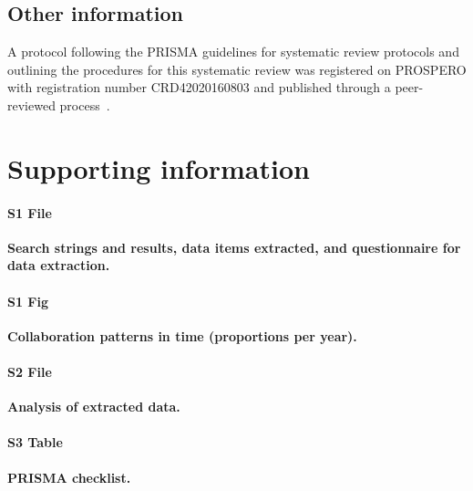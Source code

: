 \documentclass[10pt,letterpaper]{article}
\begin{document}
\subsection*{Other information}
A protocol following the PRISMA guidelines for systematic review protocols and outlining the procedures for this systematic review was registered on PROSPERO with registration number CRD42020160803 and published through a peer-reviewed process~\cite{Azam2020}. 
 
\section*{Supporting information}

\paragraph*{S1 File}
\label{S1_File}
{\bf Search strings and results, data items extracted, and questionnaire for data extraction.} 

\paragraph*{S1 Fig}
\label{S1_Fig}
{\bf Collaboration patterns in time (proportions per year).}

\paragraph*{S2 File}
\label{S2_File}
{\bf Analysis of extracted data.} 

\paragraph*{S3 Table}
\label{S3_Table}
{\bf PRISMA checklist.} 




\nolinenumbers
\end{document}
